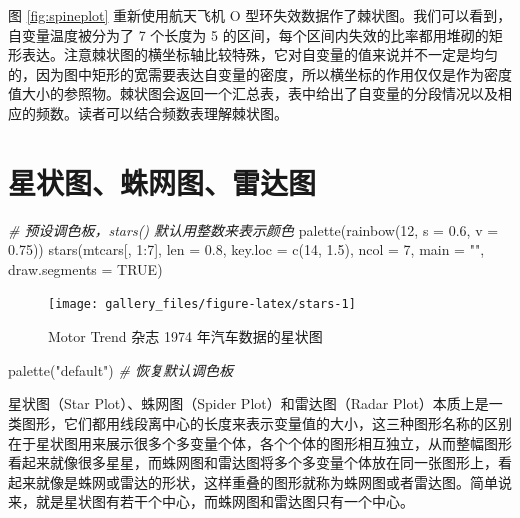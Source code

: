 \documentclass[
  b5paper,
  UTF8,twoside]{book}
\newenvironment{Shaded}{\begin{snugshade}}{\end{snugshade}}
\newcommand{\AttributeTok}[1]{\textcolor[rgb]{0.77,0.63,0.00}{#1}}
\newcommand{\CommentTok}[1]{\textcolor[rgb]{0.56,0.35,0.01}{\textit{#1}}}
\newcommand{\ConstantTok}[1]{\textcolor[rgb]{0.00,0.00,0.00}{#1}}
\newcommand{\DecValTok}[1]{\textcolor[rgb]{0.00,0.00,0.81}{#1}}
\newcommand{\FloatTok}[1]{\textcolor[rgb]{0.00,0.00,0.81}{#1}}
\newcommand{\FunctionTok}[1]{\textcolor[rgb]{0.00,0.00,0.00}{#1}}
\newcommand{\NormalTok}[1]{#1}
\newcommand{\SpecialCharTok}[1]{\textcolor[rgb]{0.00,0.00,0.00}{#1}}
\newcommand{\StringTok}[1]{\textcolor[rgb]{0.31,0.60,0.02}{#1}}
\begin{document}
图 \ref{fig:spineplot} 重新使用航天飞机 O 型环失效数据作了棘状图。我们可以看到，自变量温度被分为了 7 个长度为 5 的区间，每个区间内失效的比率都用堆砌的矩形表达。注意棘状图的横坐标轴比较特殊，它对自变量的值来说并不一定是均匀的，因为图中矩形的宽需要表达自变量的密度，所以横坐标的作用仅仅是作为密度值大小的参照物。棘状图会返回一个汇总表，表中给出了自变量的分段情况以及相应的频数。读者可以结合频数表理解棘状图。

\hypertarget{sec:stars}{%
\section{星状图、蛛网图、雷达图}\label{sec:stars}}





\begin{Shaded}
\begin{Highlighting}[]
\CommentTok{\# 预设调色板，stars() 默认用整数来表示颜色}
\FunctionTok{palette}\NormalTok{(}\FunctionTok{rainbow}\NormalTok{(}\DecValTok{12}\NormalTok{, }\AttributeTok{s =} \FloatTok{0.6}\NormalTok{, }\AttributeTok{v =} \FloatTok{0.75}\NormalTok{))}
\FunctionTok{stars}\NormalTok{(mtcars[, }\DecValTok{1}\SpecialCharTok{:}\DecValTok{7}\NormalTok{], }\AttributeTok{len =} \FloatTok{0.8}\NormalTok{, }\AttributeTok{key.loc =} \FunctionTok{c}\NormalTok{(}\DecValTok{14}\NormalTok{, }\FloatTok{1.5}\NormalTok{), }\AttributeTok{ncol =} \DecValTok{7}\NormalTok{, }
      \AttributeTok{main =} \StringTok{""}\NormalTok{, }\AttributeTok{draw.segments =} \ConstantTok{TRUE}\NormalTok{)}
\end{Highlighting}
\end{Shaded}

\begin{figure}

{\centering \texttt{[image: gallery\_files/figure-latex/stars-1]} 

}

\caption[Motor Trend 杂志 1974 年汽车数据的星状图]{Motor Trend 杂志 1974 年汽车数据的星状图}\label{fig:stars}
\end{figure}

\begin{Shaded}
\begin{Highlighting}[]
\FunctionTok{palette}\NormalTok{(}\StringTok{"default"}\NormalTok{) }\CommentTok{\# 恢复默认调色板}
\end{Highlighting}
\end{Shaded}

星状图（Star Plot）、蛛网图（Spider Plot）和雷达图（Radar Plot）本质上是一类图形，它们都用线段离中心的长度来表示变量值的大小，这三种图形名称的区别在于星状图用来展示很多个多变量个体，各个个体的图形相互独立，从而整幅图形看起来就像很多星星，而蛛网图和雷达图将多个多变量个体放在同一张图形上，看起来就像是蛛网或雷达的形状，这样重叠的图形就称为蛛网图或者雷达图。简单说来，就是星状图有若干个中心，而蛛网图和雷达图只有一个中心。
\end{document}
